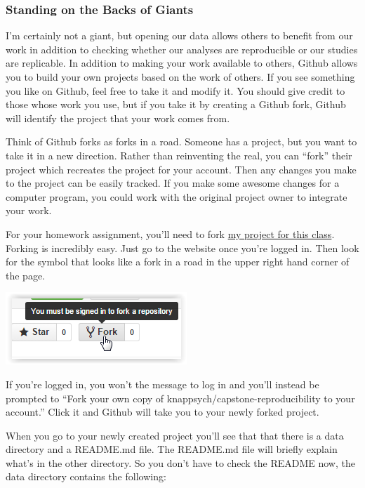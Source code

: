 \documentclass[12pt]{article}
\begin{document}
\subsubsection{Standing on the Backs of Giants}
I'm certainly not a giant, but opening our data allows others to benefit from our work in addition to
checking whether our analyses are reproducible or our studies are replicable. In addition to making
your work available to others, Github allows you to build your own projects based on the work of
others. If you see something you like on Github, feel free to take it and modify it. You should
give credit to those whose work you use, but if you take it by creating a Github fork, Github will
identify the project that your work comes from.

Think of Github forks as forks in a road. Someone has a project, but you want to take it in a new
direction. Rather than reinventing the real, you can ``fork'' their project which recreates the
project for your account. Then any changes you make to the project can be easily tracked. If
you make some awesome changes for a computer program, you could work with the original project owner
to integrate your work.

For your homework assignment, you'll need to fork
\href{https://github.com/knappsych/capstone-reproducibility}{my project for this class}. Forking is
incredibly easy. Just go to the website once you're logged in. Then look for the symbol that looks
like a fork in a road in the upper right hand corner of the page.

\includegraphics{imgs/Github07.PNG}

If you're logged in, you won't the message to log in and you'll instead be prompted to ``Fork your
own copy of knappsych/capstone-reproducibility to your account.'' Click it and Github will take you
to your newly forked project.

When you go to your newly created project you'll see that that there is a data directory and a
README.md file. The README.md file will briefly explain what's in the other
directory. So you don't have to check the README now, the data directory contains the following:
\end{document}
